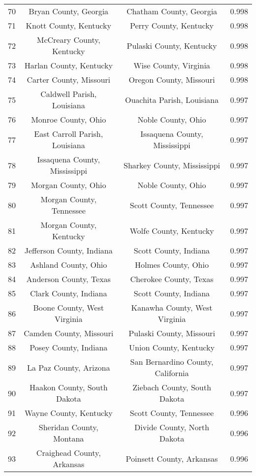 \begin{longtable}{cccc}
  70 & Bryan County, Georgia & Chatham County, Georgia & 0.998 \\ 
  71 & Knott County, Kentucky & Perry County, Kentucky & 0.998 \\ 
  72 & McCreary County, Kentucky & Pulaski County, Kentucky & 0.998 \\ 
  73 & Harlan County, Kentucky & Wise County, Virginia & 0.998 \\ 
  74 & Carter County, Missouri & Oregon County, Missouri & 0.998 \\ 
  75 & Caldwell Parish, Louisiana & Ouachita Parish, Louisiana & 0.997 \\ 
  76 & Monroe County, Ohio & Noble County, Ohio & 0.997 \\ 
  77 & East Carroll Parish, Louisiana & Issaquena County, Mississippi & 0.997 \\ 
  78 & Issaquena County, Mississippi & Sharkey County, Mississippi & 0.997 \\ 
  79 & Morgan County, Ohio & Noble County, Ohio & 0.997 \\ 
  80 & Morgan County, Tennessee & Scott County, Tennessee & 0.997 \\ 
  81 & Morgan County, Kentucky & Wolfe County, Kentucky & 0.997 \\ 
  82 & Jefferson County, Indiana & Scott County, Indiana & 0.997 \\ 
  83 & Ashland County, Ohio & Holmes County, Ohio & 0.997 \\ 
  84 & Anderson County, Texas & Cherokee County, Texas & 0.997 \\ 
  85 & Clark County, Indiana & Scott County, Indiana & 0.997 \\ 
  86 & Boone County, West Virginia & Kanawha County, West Virginia & 0.997 \\ 
  87 & Camden County, Missouri & Pulaski County, Missouri & 0.997 \\ 
  88 & Posey County, Indiana & Union County, Kentucky & 0.997 \\ 
  89 & La Paz County, Arizona & San Bernardino County, California & 0.997 \\ 
  90 & Haakon County, South Dakota & Ziebach County, South Dakota & 0.997 \\ 
  91 & Wayne County, Kentucky & Scott County, Tennessee & 0.996 \\ 
  92 & Sheridan County, Montana & Divide County, North Dakota & 0.996 \\ 
  93 & Craighead County, Arkansas & Poinsett County, Arkansas & 0.996 \\ 

\end{longtable}
